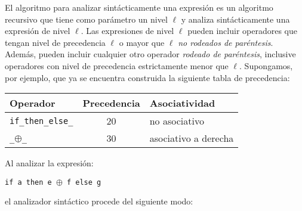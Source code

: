 El algoritmo para analizar sintácticamente una expresión es un algoritmo recursivo
que tiene como parámetro un nivel $\ell$
y analiza sintácticamente una expresión de nivel $\ell$.
Las expresiones de nivel $\ell$ pueden incluir
operadores que tengan nivel de precedencia $\ell$ o mayor que $\ell$
{\em no rodeados de paréntesis}.
Además, pueden incluir cualquier otro operador {\em rodeado de paréntesis},
inclusive operadores con nivel de precedencia estrictamente menor que $\ell$.
Supongamos, por ejemplo, que ya se encuentra construida la siguiente tabla de precedencia:
\begin{center}
\begin{tabular}{l|c|l}
{\bf Operador}             & {\bf Precedencia} & {\bf Asociatividad} \\
\hline
\texttt{if\_then\_else\_}  & 20                & no asociativo \\
\texttt{\_$\oplus$\_}      & 30                & asociativo a derecha \\
\end{tabular}
\end{center}
Al analizar la expresión:
\begin{center}
\texttt{if a then e $\oplus$ f else g}
\end{center}
el analizador sintáctico procede del siguiente modo:
